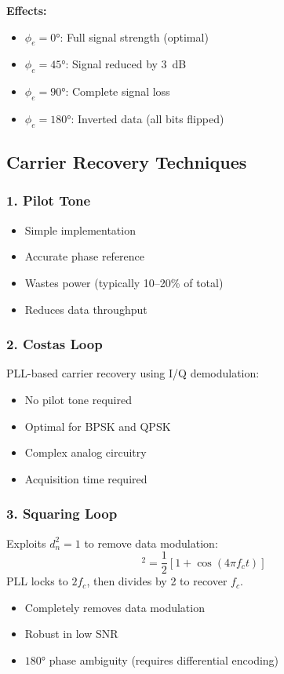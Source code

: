 \textbf{Effects:}
\begin{itemize}
\item $\phi_e = 0°$: Full signal strength (optimal)
\item $\phi_e = 45°$: Signal reduced by 3~dB
\item $\phi_e = 90°$: Complete signal loss
\item $\phi_e = 180°$: Inverted data (all bits flipped)
\end{itemize}

\subsection{Carrier Recovery Techniques}

\subsubsection{1. Pilot Tone}
\begin{itemize}
\item[\checkmark] Simple implementation
\item[\checkmark] Accurate phase reference
\item[\texttimes] Wastes power (typically 10--20\% of total)
\item[\texttimes] Reduces data throughput
\end{itemize}

\subsubsection{2. Costas Loop}
PLL-based carrier recovery using I/Q demodulation:
\begin{itemize}
\item[\checkmark] No pilot tone required
\item[\checkmark] Optimal for BPSK and QPSK
\item[\texttimes] Complex analog circuitry
\item[\texttimes] Acquisition time required
\end{itemize}

\subsubsection{3. Squaring Loop}
Exploits $d_n^2 = 1$ to remove data modulation:
\begin{equation}
[d_n \cos(2\pi f_c t)]^2 = \frac{1}{2}[1 + \cos(4\pi f_c t)]
\end{equation}
PLL locks to $2f_c$, then divides by 2 to recover $f_c$.
\begin{itemize}
\item[\checkmark] Completely removes data modulation
\item[\checkmark] Robust in low SNR
\item[\texttimes] $180°$ phase ambiguity (requires differential encoding)
\end{itemize}

